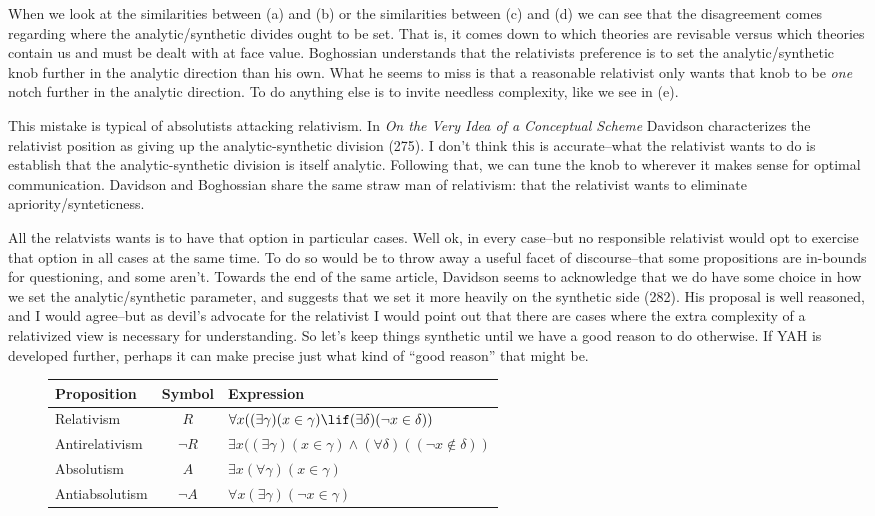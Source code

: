 \documentclass[12pt]{article}
\begin{document}
\begin{flushleft}
When we look at the similarities between (a) and (b) or the similarities between (c) and (d) we can see that the disagreement comes regarding where the analytic/synthetic divides ought to be set.
That is, it comes down to which theories are revisable versus which theories contain us and must be dealt with at face value.
Boghossian understands that the relativists preference is to set the analytic/synthetic knob further in the analytic direction than his own.
What he seems to miss is that a reasonable relativist only wants that knob to be \textit{one} notch further in the analytic direction.
To do anything else is to invite needless complexity, like we see in (e).

This mistake is typical of absolutists attacking relativism.
In \textit{On the Very Idea of a Conceptual Scheme} Davidson characterizes the relativist position as giving up the analytic-synthetic division (275).
I don't think this is accurate--what the relativist wants to do is establish that the analytic-synthetic division is itself analytic.
Following that, we can tune the knob to wherever it makes sense for optimal communication.
Davidson and Boghossian share the same straw man of relativism: that the relativist wants to eliminate apriority/synteticness.

All the relatvists wants is to have that option in particular cases.
Well ok, in every case--but no responsible relativist would opt to exercise that option in all cases at the same time.
To do so would be to throw away a useful facet of discourse--that some propositions are in-bounds for questioning, and some aren't.
Towards the end of the same article, Davidson seems to acknowledge that we do have some choice in how we set the analytic/synthetic parameter, and suggests that we set it more heavily on the synthetic side (282).
His proposal is well reasoned, and I would agree--but as devil's advocate for the relativist I would point out that there are cases where the extra complexity of a relativized view is necessary for understanding.
So let's keep things synthetic until we have a good reason to do otherwise.
If YAH is developed further, perhaps it can make precise just what kind of ``good reason'' that might be.

\begin{figure}[h]
    \begin{tabular}{l|c|l}
        \hline
        Proposition & Symbol & Expression \\ \hline
        Relativism  & $R$ & $\forall{x}((\exists{\gamma})(x \in \gamma) \lif (\exists{\delta})({\lnot}x \in \delta))$ \\
        Antirelativism & $\neg R$ & $\exists{x}((\exists{\gamma})(x \in \gamma) \land (\forall{\delta})(({\neg}x \notin \delta))$ \\
        Absolutism & $A$ & $\exists{x}(\forall{\gamma})(x \in \gamma)$ \\
        Antiabsolutism & $\neg A$ & $\forall{x}(\exists{\gamma})({\lnot}x \in \gamma)$ \\
    \end{tabular}\\
    \par\bigskip


\end{figure}
\end{flushleft}
\end{document}
